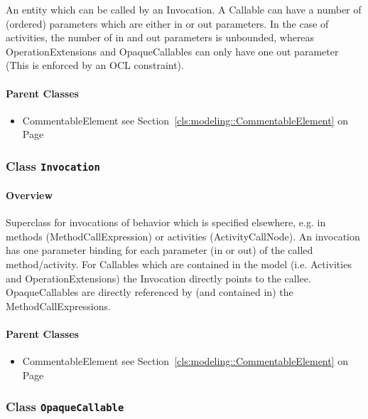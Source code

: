 	
			
An entity which can be called by an Invocation. A Callable can have a number of (ordered) parameters which are either in or out parameters. In the case of activities, the number of in and out parameters is unbounded, whereas OperationExtensions and OpaqueCallables can only have one out parameter (This is enforced by an OCL constraint).	
		
	



\paragraph{Parent Classes}
\begin{itemize}
\item CommentableElement see Section~\ref{cls:modeling::CommentableElement} on Page~\pageref{cls:modeling::CommentableElement}\end{itemize}
\subsubsection{\Large{Class \bfseries \texttt{Invocation}\normalfont}}
\label{cls:modeling::calls::Invocation} 
\paragraph{Overview}

	
			
Superclass for invocations of behavior which is specified elsewhere, e.g. in methods (MethodCallExpression) or activities (ActivityCallNode). An invocation has one parameter binding for each parameter (in or out) of the called method/activity. For Callables which are contained in the model (i.e. Activities and OperationExtensions) the Invocation directly points to the callee. OpaqueCallables are directly referenced by (and contained in) the MethodCallExpressions.	
		
	



\paragraph{Parent Classes}
\begin{itemize}
\item CommentableElement see Section~\ref{cls:modeling::CommentableElement} on Page~\pageref{cls:modeling::CommentableElement}\end{itemize}
\subsubsection{\Large{Class \bfseries \texttt{OpaqueCallable}\normalfont}}
\label{cls:modeling::calls::OpaqueCallable} 
